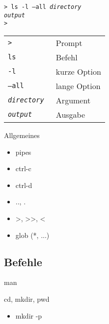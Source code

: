 \documentclass[t]{beamer}
\begin{document}
      \begin{frame}
        \texttt{> ls -l --all \textit{directory}\\
             \textit{output}\\
             >}
        \begin{center}
          \begin{tabular}{>{\tt}l l}
            \toprule
            >                  & Prompt       \\
            ls                 & Befehl       \\
            -l                 & kurze Option \\
            --all              & lange Option \\
            \textit{directory} & Argument     \\
            \textit{output}    & Ausgabe      \\
            \bottomrule
          \end{tabular}
        \end{center}
      \end{frame}

      \begin{frame}{Allgemeines}
        \begin{itemize}
          \item pipes\\
          \item ctrl-c\\
          \item ctrl-d\\
          \item .., .\\
          \item >, >>, <\\
          \item glob (*, ...)
        \end{itemize}
      \end{frame}

    \subsection{Befehle}
      \begin{frame}{man}
      \end{frame}

      \begin{frame}{cd, mkdir, pwd}
        \begin{itemize}
          \item mkdir -p
        \end{itemize}
      \end{frame}
\end{document}

